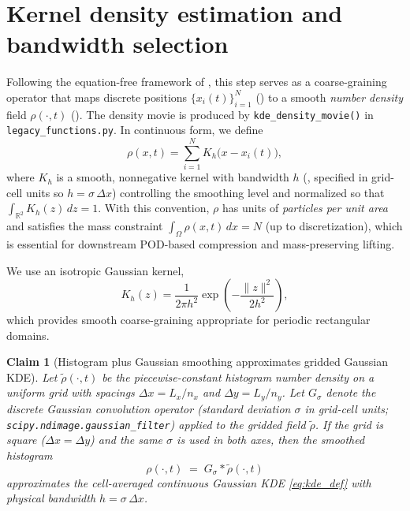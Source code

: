\documentclass{report}
\theoremstyle{plain}
\newtheorem{claim}[theorem]{Claim}
\theoremstyle{remark}
\numberwithin{equation}{section}              %
\begin{document}
%
%
%
%
%

\section{Kernel density estimation and bandwidth selection}
\label{subsec:kde}
Following the equation-free framework of \cite{alvarez2025eqfree}, this step serves as a coarse-graining  operator that maps discrete positions $\{x_i(t)\}_{i=1}^N$ () to a smooth \emph{number density} field $\rho(\cdot,t)$ ().
The density movie is produced by \texttt{kde\_density\_movie()} in \texttt{legacy\_functions.py}.
In continuous form, we define
\begin{equation}
\rho(x,t)
=
\sum_{i=1}^N K_h\!\bigl(x-x_i(t)\bigr),
\label{eq:kde_def}
\end{equation}
where $K_h$ is a smooth, nonnegative kernel with bandwidth $h$ (, specified in grid-cell units so $h=\sigma\,\Delta x$) controlling the smoothing level and normalized so that
$\int_{\mathbb{R}^2} K_h(z)\,dz = 1$.
With this convention, $\rho$ has units of \emph{particles per unit area} and satisfies the mass constraint
$\int_\Omega \rho(x,t)\,dx = N$ (up to discretization), which is essential for downstream POD-based compression and mass-preserving lifting.

We use an isotropic Gaussian kernel,
\begin{equation}
K_h(z)
=
\frac{1}{2\pi h^2}
\exp\!\left(-\frac{\|z\|^2}{2h^2}\right),
\label{eq:gaussian_kernel}
\end{equation}
which provides smooth coarse-graining appropriate for periodic rectangular domains.

\begin{claim}[Histogram plus Gaussian smoothing approximates gridded Gaussian KDE]
\label{claim:histogram_kde}
Let $\tilde\rho(\cdot,t)$ be the piecewise-constant histogram number density on a uniform grid with spacings
$\Delta x = L_x/n_x$ and $\Delta y = L_y/n_y$.
Let $G_\sigma$ denote the discrete Gaussian convolution operator (standard deviation $\sigma$ in \emph{grid-cell units}; \texttt{scipy.ndimage.gaussian\_filter}) applied to the gridded field $\tilde\rho$.
If the grid is square ($\Delta x=\Delta y$) and the same $\sigma$ is used in both axes, then the smoothed histogram
\begin{equation}
\rho(\cdot,t) \;=\; G_\sigma * \tilde\rho(\cdot,t)
\label{eq:smoothed_histogram}
\end{equation}
approximates the \emph{cell-averaged} continuous Gaussian KDE \eqref{eq:kde_def} with physical bandwidth $h=\sigma\,\Delta x$.
\end{claim}
\end{document}
